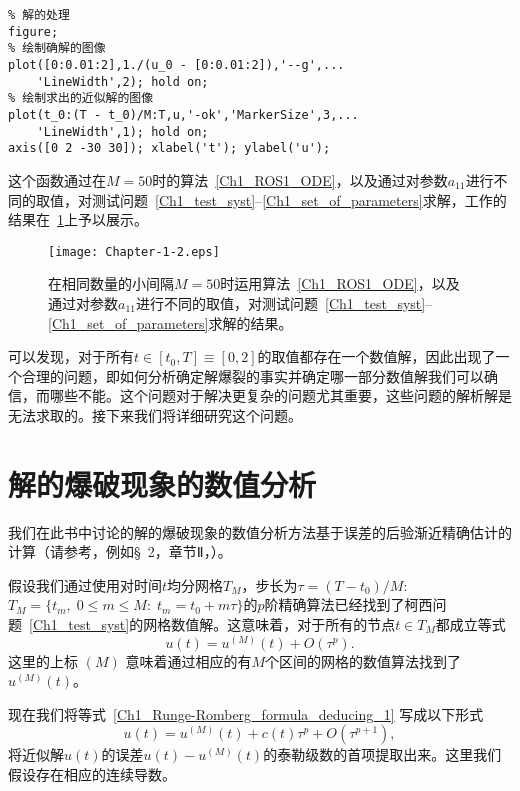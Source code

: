 \documentclass[twoside]{book}
\begin{document}
\begin{CJK*}{GBK}{song}
\begin{framed}
\begin{lstlisting}
% 解的处理
figure;
% 绘制确解的图像
plot([0:0.01:2],1./(u_0 - [0:0.01:2]),'--g',...
    'LineWidth',2); hold on;
% 绘制求出的近似解的图像
plot(t_0:(T - t_0)/M:T,u,'-ok','MarkerSize',3,...
    'LineWidth',1); hold on;
axis([0 2 -30 30]); xlabel('t'); ylabel('u');
\end{lstlisting}
\end{framed}

这个函数通过在$M = 50$时的算法~\eqref{Ch1_ROS1_ODE}，以及通过对参数$a_{11}$进行不同的取值，对测试问题~\eqref{Ch1_test_syst}--\eqref{Ch1_set_of_parameters}求解，工作的结果在~\ref{Fig_1_2}上予以展示。
\begin{figure}[t]
    \centering
    \texttt{[image: Chapter-1-2.eps]}\\
    \caption{在相同数量的小间隔$M = 50$时运用算法~\eqref{Ch1_ROS1_ODE}，以及通过对参数$a_{11}$进行不同的取值，对测试问题~\eqref{Ch1_test_syst}--\eqref{Ch1_set_of_parameters}求解的结果。}
    \label{Fig_1_2}
\end{figure}

可以发现，对于所有$t \in [t_0,T] \equiv [0,2]$的取值都存在一个数值解，因此出现了一个合理的问题，即如何分析确定解爆裂的事实并确定哪一部分数值解我们可以确信，而哪些不能。这个问题对于解决更复杂的问题尤其重要，这些问题的解析解是无法求取的。接下来我们将详细研究这个问题。



\section{解的爆破现象的数值分析}

我们在此书中讨论的解的爆破现象的数值分析方法基于误差的后验渐近精确估计的计算（请参考，例如\S~2，章节Ⅱ，\cite{Kalitkin_book_3}）。

假设我们通过使用对时间$t$均分网格$T_M$，步长为$\tau = (T - t_0)/M$: $T_M = \{t_m, \; 0 \leqslant m \leqslant M: \; t_m = t_0 + m \tau\}$的$p$阶精确算法已经找到了柯西问题~\eqref{Ch1_test_syst}的网格数值解。这意味着，对于所有的节点$t \in T_M$都成立等式
\begin{equation}
    \label{Ch1_Runge-Romberg_formula_deducing_1}
    u(t) = u^{(M)}(t) + O(\tau^p).
\end{equation}
这里的上标 $(M)$ 意味着通过相应的有$M$个区间的网格的数值算法找到了 $u^{(M)}(t)$。

现在我们将等式~\eqref{Ch1_Runge-Romberg_formula_deducing_1} 写成以下形式
\begin{equation}
    \label{Ch1_Runge-Romberg_formula_deducing_2}
    u(t) = u^{(M)}(t) + c(t) \tau^p + O(\tau^{p + 1}),
\end{equation}
将近似解$u(t)$的误差$u(t) - u^{(M)}(t)$的泰勒级数的首项提取出来。这里我们假设存在相应的连续导数。


\end{CJK*}
\end{document}

